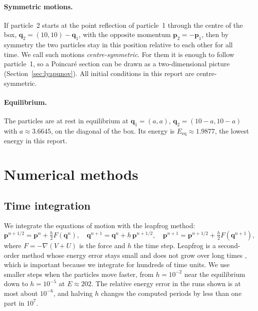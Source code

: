 \documentclass[11pt,a4paper]{article}
\newcommand{\q}{\mathbf{q}}
\newcommand{\p}{\mathbf{p}}
\begin{document}
\paragraph{Symmetric motions.}
If particle~2 starts at the point reflection of particle~1 through the centre
of the box, $\q_2=(10,10)-\q_1$, with the opposite momentum $\p_2=-\p_1$, then
by symmetry the two particles stay in this position relative to each other for
all time. We call such motions \emph{centre-symmetric}. For them it is enough
to follow particle~1, so a Poincar\'e section can be drawn as a
two-dimensional picture (Section~\ref{sec:lyapunov}). All initial conditions
in this report are centre-symmetric.

\paragraph{Equilibrium.}
The particles are at rest in equilibrium at $\q_1=(a,a)$, $\q_2=(10-a,10-a)$
with $a\approx3.6645$, on the diagonal of the box. Its energy is
$E_{\mathrm{eq}}\approx1.9877$, the lowest energy in this report.

\section{Numerical methods}\label{sec:methods}

\subsection{Time integration}
We integrate the equations of motion with the leapfrog method:
\begin{equation}\label{eq:leapfrog}
  \p^{n+1/2}=\p^n+\tfrac h2 F(\q^n),\quad
  \q^{n+1}=\q^n+h\,\p^{n+1/2},\quad
  \p^{n+1}=\p^{n+1/2}+\tfrac h2 F(\q^{n+1}),
\end{equation}
where $F=-\nabla(V+U)$ is the force and $h$ the time step. Leapfrog is a
second-order method whose energy error stays small and does not grow over long
times \cite{hairer2006}, which is important because we integrate for hundreds
of time units. We use smaller steps when the particles move faster, from
$h=10^{-2}$ near the equilibrium down to $h=10^{-5}$ at $E\approx202$. The
relative energy error in the runs shown is at most about $10^{-6}$, and
halving $h$ changes the computed periods by less than one part in $10^{7}$.
\end{document}
